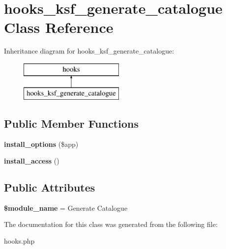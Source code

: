 \hypertarget{classhooks__ksf__generate__catalogue}{}\section{hooks\+\_\+ksf\+\_\+generate\+\_\+catalogue Class Reference}
\label{classhooks__ksf__generate__catalogue}
Inheritance diagram for hooks\+\_\+ksf\+\_\+generate\+\_\+catalogue\+:\begin{figure}[H]
\begin{center}
\leavevmode
\includegraphics[height=2.000000cm]{dd/d8c/classhooks__ksf__generate__catalogue}
\end{center}
\end{figure}
\subsection*{Public Member Functions}
\begin{DoxyCompactItemize}
\item 
\hypertarget{classhooks__ksf__generate__catalogue_ac4dd1b1aa750811bb9b32dc195fcf420}{}\label{classhooks__ksf__generate__catalogue_ac4dd1b1aa750811bb9b32dc195fcf420} 
{\bfseries install\+\_\+options} (\$app)
\item 
\hypertarget{classhooks__ksf__generate__catalogue_ae15273e8ca8ceb7f37bdddc3211776d6}{}\label{classhooks__ksf__generate__catalogue_ae15273e8ca8ceb7f37bdddc3211776d6} 
{\bfseries install\+\_\+access} ()
\end{DoxyCompactItemize}
\subsection*{Public Attributes}
\begin{DoxyCompactItemize}
\item 
\hypertarget{classhooks__ksf__generate__catalogue_a9847dd3a50ee2ee5c2c77297514663b7}{}\label{classhooks__ksf__generate__catalogue_a9847dd3a50ee2ee5c2c77297514663b7} 
{\bfseries \$module\+\_\+name} = \textquotesingle{}Generate Catalogue\textquotesingle{}
\end{DoxyCompactItemize}


The documentation for this class was generated from the following file\+:\begin{DoxyCompactItemize}
\item 
hooks.\+php\end{DoxyCompactItemize}

